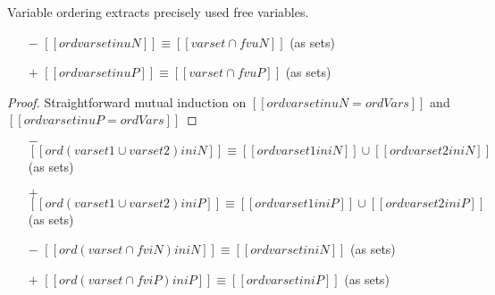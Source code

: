 \begin{lemma}
  \label{lemma:ord-soundness}
  Variable ordering extracts precisely used free variables.
  \begin{itemize}
    \item[$-$] $[[ ord varset in uN ]] \equiv [[varset ∩ fv uN]]$ (as sets)
    \item[$+$] $[[ ord varset in uP ]] \equiv [[varset ∩ fv uP]]$ (as sets)
  \end{itemize}
\end{lemma}
\begin{proof}
  Straightforward mutual induction on 
  $[[ ord varset in uN = ordVars ]]$ and $[[ ord varset in uP = ordVars ]]$
\end{proof}


\begin{corollary}
  \label{corollary:ord-additivity}
  \begin{itemize}
    \item[$-$] $[[ ord (varset1 ∪ varset2) in iN ]]
                \equiv
                [[ord varset1 in iN]] \cup [[ord varset2 in iN]]$ (as sets)
    \item[$+$] $[[ ord (varset1 ∪ varset2) in iP ]]
                \equiv
                [[ord varset1 in iP]] \cup [[ord varset2 in iP]]$ (as sets)

  \end{itemize}
\end{corollary}

\begin{corollary}
  \label{corollary:ord-weakening}
  \begin{itemize}
  \item[$-$] $[[ ord (varset ∩ fv iN) in iN ]] \equiv [[ ord varset in iN ]]$ (as sets)
  \item[$+$] $[[ ord (varset ∩ fv iP) in iP ]] \equiv [[ ord varset in iP ]]$ (as sets)
  \end{itemize}
\end{corollary}



